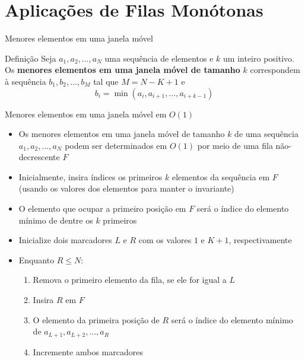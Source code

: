 \section{Aplicações de Filas Monótonas}

\begin{frame}[fragile]{Menores elementos em uma janela móvel}

    \begin{block}{Definição}
        Seja $a_1, a_2, \ldots, a_N$ uma sequência de elementos e $k$ um inteiro positivo. Os \textbf{menores elementos em uma janela móvel de tamanho} $k$ correspondem à sequência $b_1, b_2, \ldots, b_M$ tal que
$M = N - K + 1$ e
$$
        b_i = \min(a_i, a_{i + 1}, \ldots, a_{i + k - 1})
$$
    \end{block}

\end{frame}

\begin{frame}[fragile]{Menores elementos em uma janela móvel em $O(1)$}

    \begin{itemize}
        \item Os menores elementos em uma janela móvel de tamanho $k$ de uma sequência $a_1, a_2, \ldots, a_N$ podem ser determinados em $O(1)$ por meio de uma fila não-decrescente $F$

        \item Inicialmente, insira índices os primeiros $k$ elementos da sequência em $F$ (usando os
            valores dos elementos para manter o invariante)

        \item O elemento que ocupar a primeiro posição em $F$ será o índice do elemento mínimo de dentre 
            os $k$ primeiros

        \item Inicialize dois marcadores $L$ e $R$ com os valores $1$ e $K + 1$, respectivamente

        \item  Enquanto $R \leq N$:
            \begin{enumerate}
                \item Remova o primeiro elemento da fila, se ele for igual a $L$
                \item Insira $R$ em $F$
                \item O elemento da primeira posição de $R$ será o índice do elemento mínimo de 
                    $a_{L + 1}, a_{L + 2}, \ldots, a_R$
                \item Incremente ambos marcadores
            \end{enumerate}
    \end{itemize}
\end{frame}

